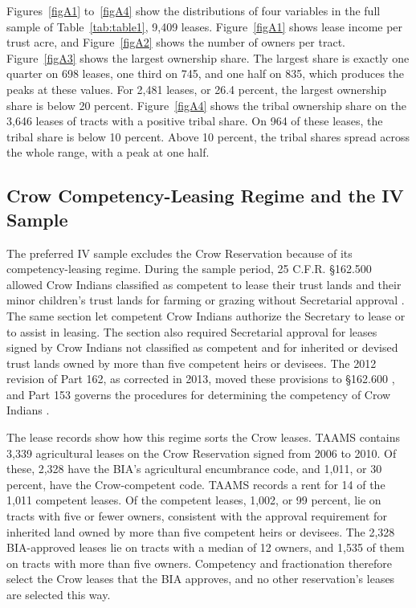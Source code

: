 \documentclass[12pt]{article}
\begin{document}
Figures~\ref{figA1} to~\ref{figA4} show the distributions of four variables in the full sample of Table~\ref{tab:table1}, 9,409 leases. Figure~\ref{figA1} shows lease income per trust acre, and Figure~\ref{figA2} shows the number of owners per tract. Figure~\ref{figA3} shows the largest ownership share. The largest share is exactly one quarter on 698 leases, one third on 745, and one half on 835, which produces the peaks at these values. For 2,481 leases, or 26.4 percent, the largest ownership share is below 20 percent. Figure~\ref{figA4} shows the tribal ownership share on the 3,646 leases of tracts with a positive tribal share. On 964 of these leases, the tribal share is below 10 percent. Above 10 percent, the tribal shares spread across the whole range, with a peak at one half.
\vspace{2mm}

\subsection*{Crow Competency-Leasing Regime and the IV Sample}

The preferred IV sample excludes the Crow Reservation because of its competency-leasing regime. During the sample period, 25 C.F.R. \S 162.500 allowed Crow Indians classified as competent to lease their trust lands and their minor children's trust lands for farming or grazing without Secretarial approval \citep{CFR2008Part162}. The same section let competent Crow Indians authorize the Secretary to lease or to assist in leasing. The section also required Secretarial approval for leases signed by Crow Indians not classified as competent and for inherited or devised trust lands owned by more than five competent heirs or devisees. The 2012 revision of Part 162, as corrected in 2013, moved these provisions to \S 162.600 \citep{BIA2012,ECFR25CFR162600}, and Part 153 governs the procedures for determining the competency of Crow Indians \citep{ECFR25CFR153}.

The lease records show how this regime sorts the Crow leases. TAAMS contains 3,339 agricultural leases on the Crow Reservation signed from 2006 to 2010. Of these, 2,328 have the BIA's agricultural encumbrance code, and 1,011, or 30 percent, have the Crow-competent code. TAAMS records a rent for 14 of the 1,011 competent leases. Of the competent leases, 1,002, or 99 percent, lie on tracts with five or fewer owners, consistent with the approval requirement for inherited land owned by more than five competent heirs or devisees. The 2,328 BIA-approved leases lie on tracts with a median of 12 owners, and 1,535 of them on tracts with more than five owners. Competency and fractionation therefore select the Crow leases that the BIA approves, and no other reservation's leases are selected this way.
\end{document}
